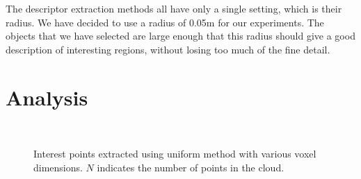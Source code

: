 \documentclass[11pt,a4paper]{kth-mag}
\begin{document}
The descriptor extraction methods all have only a single setting, which is their
radius. We have decided to use a radius of 0.05m for our experiments. The
objects that we have selected are large enough that this radius should give a
good description of interesting regions, without losing too much of the fine
detail.

\newpage
\section{Analysis}
\begin{figure}
  \centering
  \centerline{
    \\
  }
  \centerline{
  }
  \caption{Interest points extracted using uniform method with various voxel
    dimensions. $N$ indicates the number of points in the cloud.}
  \label{fig:intuni}
\end{figure}
\end{document}
